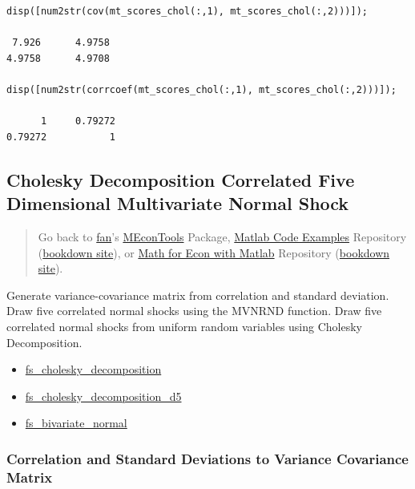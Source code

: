 \documentclass[
]{book}
\begin{document}
\begin{verbatim}
disp([num2str(cov(mt_scores_chol(:,1), mt_scores_chol(:,2)))]);

 7.926      4.9758
4.9758      4.9708

disp([num2str(corrcoef(mt_scores_chol(:,1), mt_scores_chol(:,2)))]);

      1     0.79272
0.79272           1
\end{verbatim}

\hypertarget{cholesky-decomposition-correlated-five-dimensional-multivariate-normal-shock}{%
\subsection{Cholesky Decomposition Correlated Five Dimensional Multivariate Normal Shock}\label{cholesky-decomposition-correlated-five-dimensional-multivariate-normal-shock}}

\begin{quote}
Go back to \href{http://fanwangecon.github.io/}{fan}'s \href{https://fanwangecon.github.io/MEconTools/}{MEconTools} Package, \href{https://fanwangecon.github.io/M4Econ/}{Matlab Code Examples} Repository (\href{https://fanwangecon.github.io/M4Econ/bookdown}{bookdown site}), or \href{https://fanwangecon.github.io/Math4Econ/}{Math for Econ with Matlab} Repository (\href{https://fanwangecon.github.io/Math4Econ/bookdown}{bookdown site}).
\end{quote}

Generate variance-covariance matrix from correlation and standard
deviation. Draw five correlated normal shocks using the MVNRND function.
Draw five correlated normal shocks from uniform random variables using
Cholesky Decomposition.

\begin{itemize}
\item
  \href{https://fanwangecon.github.io/M4Econ/simulation/normal/htmlpdfm/fs_cholesky_decomposition.html}{fs\_cholesky\_decomposition}
\item
  \href{https://fanwangecon.github.io/M4Econ/simulation/normal/htmlpdfm/fs_cholesky_decomposition_d5.html}{fs\_cholesky\_decomposition\_d5}
\item
  \href{https://fanwangecon.github.io/M4Econ/simulation/normal/htmlpdfm/fs_bivariate_normal.html}{fs\_bivariate\_normal}
\end{itemize}

\hypertarget{correlation-and-standard-deviations-to-variance-covariance-matrix}{%
\subsubsection{Correlation and Standard Deviations to Variance Covariance Matrix}\label{correlation-and-standard-deviations-to-variance-covariance-matrix}}
\end{document}
